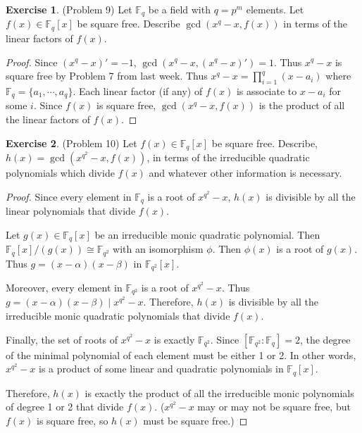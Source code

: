 \documentclass[12pt, psamsfonts]{amsart}
\theoremstyle{definition}
\newtheorem*{exer}{Exercise}
\theoremstyle{remark}
\numberwithin{equation}{section}
\begin{document}
\begin{exer}{(Problem 9)}
  Let $\mathbb{F}_q$ be a field with $q = p^m$ elements.
  Let $f(x) \in \mathbb{F}_q[x]$ be square free.
  Describe $\gcd(x^q - x, f(x))$ in terms of the linear factors of $f(x)$.
\end{exer}

\begin{proof}
  Since $(x^q - x)' = -1$, $\gcd(x^q - x, (x^q - x)') = 1$.
  Thus $x^q - x$ is square free by Problem 7 from last week.
  Thus $x^q - x = \prod_{i=1}^{q} (x - a_i)$ where $\mathbb{F}_q = \{ a_1, \cdots, a_q \}$.
  Each linear factor (if any) of $f(x)$ is associate to $x - a_i$ for some $i$.
  Since $f(x)$ is square free, $\gcd(x^q - x, f(x))$ is the product of all the linear factors of $f(x)$.
\end{proof}

\begin{exer}{(Problem 10)}
  Let $f(x) \in \mathbb{F}_q[x]$ be square free.
  Describe, $h(x) = \gcd(x^{q^2} - x, f(x))$, in terms of the irreducible quadratic polynomials which divide $f(x)$ and whatever other information is necessary.
\end{exer}

\begin{proof}
  Since every element in $\mathbb{F}_q$ is a root of $x^{q^2} - x$, $h(x)$ is divisible by all the linear polynomials that divide $f(x)$.

  Let $g(x) \in \mathbb{F}_q[x]$ be an irreducible monic quadratic polynomial.
  Then $\mathbb{F}_q[x]/(g(x)) \cong \mathbb{F}_{q^2}$ with an isomorphism $\phi$.
  Then $\phi(x)$ is a root of $g(x)$.
  Thus $g = (x - \alpha)(x - \beta)$ in $\mathbb{F}_{q^2}[x]$.

  Moreover, every element in $\mathbb{F}_{q^2}$ is a root of $x^{q^2} - x$.
  Thus $g = (x - \alpha)(x - \beta) \mid x^{q^2} - x$.
  Therefore, $h(x)$ is divisible by all the irreducible monic quadratic polynomials that divide $f(x)$.

  Finally, the set of roots of $x^{q^2} - x$ is exactly $\mathbb{F}_{q^2}$.
  Since $[\mathbb{F}_{q^2}:\mathbb{F}_q] = 2$, the degree of the minimal polynomial of each element must be either 1 or 2.
  In other words, $x^{q^2} - x$ is a product of some linear and quadratic polynomials in $\mathbb{F}_q[x]$.

  Therefore, $h(x)$ is exactly the product of all the irreducible monic polynomials of degree 1 or 2 that divide $f(x)$.
  ($x^{q^2} - x$ may or may not be square free, but $f(x)$ is square free, so $h(x)$ must be square free.)
\end{proof}
\end{document}
